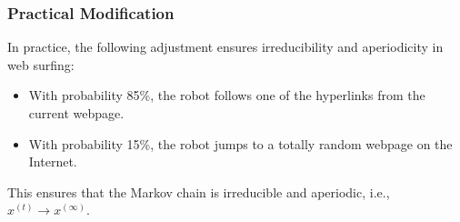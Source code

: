 \subsubsection{Practical Modification}
\begin{intuition}
    In practice, the following adjustment ensures irreducibility and aperiodicity in web surfing:
    \begin{itemize}
        \item With probability 85\%, the robot follows one of the hyperlinks from the current webpage.
        \item With probability 15\%, the robot jumps to a totally random webpage on the Internet.
    \end{itemize}

This ensures that the Markov chain is irreducible and aperiodic, i.e., $x^{(t)} \to x^{(\infty)}$.
\end{intuition}

